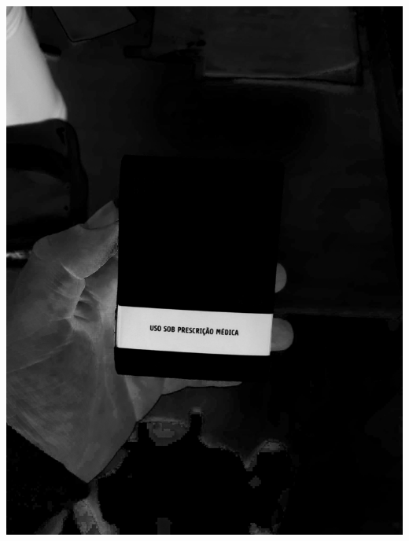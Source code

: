 \begin{frame}
\begin{columns}
\begin{column}{0.24\textwidth}
			\includegraphics[height=0.35\textheight]{../pictures/tysabri_cmyk_m_only.jpg}
			\\\vspace{\floatsep}

\end{column}
\end{columns}
\end{frame}
